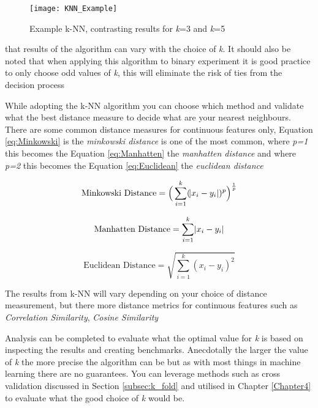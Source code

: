 \begin{figure}[H]
	\texttt{[image: KNN\_Example]}
	\caption{Example k-NN, contrasting results for \textit{k}=3 and \textit{k}=5 }
	\label{fig:KNN_Example}
\end{figure}

that results of the algorithm can vary with the choice of \textit{k}. It should also be noted that when applying this algorithm to binary experiment it is good practice to only choose odd values of \textit{k}, this will eliminate the risk of ties from the decision process \citep{keller_fuzzy_1985} 

While adopting the k-NN algorithm you can choose which method and validate what the best distance measure to decide what are your nearest neighbours. There are some common distance measures for continuous features only, Equation \ref{eq:Minkowski} is the \textit{minkowski distance} is one of the most common, where \textit{p=1} this becomes the Equation \ref{eq:Manhatten} the \textit{manhatten distance} and where \textit{p=2} this becomes the Equation \ref{eq:Euclidean} the \textit{euclidean distance}

\begin{equation} \label{eq:Minkowski}
	\text{Minkowski Distance}   = \Big(\sum_{i=1}^k (\abs{x_i-y_i})^p\Big)^\frac{1}{p}
\end{equation}

\begin{equation} \label{eq:Manhatten}
	\text{Manhatten Distance}   = \sum_{i=1}^k \abs{x_i-y_i}
\end{equation}

\begin{equation} \label{eq:Euclidean}
	\text{Euclidean Distance}   = \sqrt{\sum_{i=1}^k (x_i-y_i)^2}
\end{equation}

The results from k-NN will vary depending on your choice of distance measurement, but there more distance metrics for continuous features such as \textit{Correlation Similarity}, \textit{Cosine Similarity} \citep{sarwar_item-based_2001}

Analysis can be completed to evaluate what the optimal value for \textit{k} is based on inspecting the results and creating benchmarks. Anecdotally the larger the value of \textit{k} the more precise the algorithm can be but as with most things in machine learning there are no guarantees. You can leverage methods such as cross validation discussed in Section \ref{subsec:k_fold} and utilised in Chapter \ref{Chapter4} to evaluate what the good choice of \textit{k} would be.

